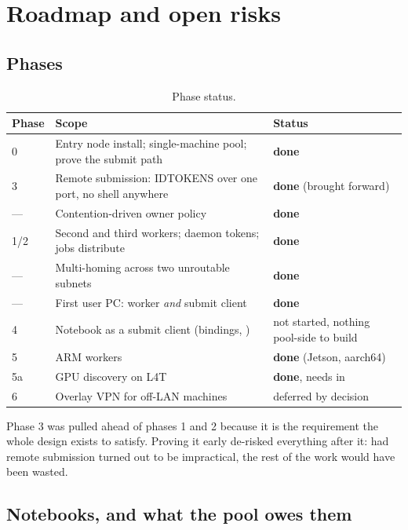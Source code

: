 \section{Roadmap and open risks}
\label{sec:limits}

\subsection{Phases}

\begin{table}[H]
\centering
\begin{tabularx}{\textwidth}{l L{0.46\textwidth} Y}
\toprule
\textbf{Phase} & \textbf{Scope} & \textbf{Status} \\
 & Entry node install; single-machine pool; prove the submit path & \textbf{done} \\
3 & Remote submission: IDTOKENS over one port, no shell anywhere & \textbf{done} (brought forward) \\
--- & Contention-driven owner policy & \textbf{done} \\
1/2 & Second and third workers; daemon tokens; jobs distribute & \textbf{done} \\
--- & Multi-homing across two unroutable subnets & \textbf{done} \\
--- & First user PC: worker \emph{and} submit client & \textbf{done} \\
4 & Notebook as a submit client (bindings, ) & not started, nothing pool-side to build \\
5 & ARM workers & \textbf{done} (Jetson, aarch64) \\
5a & GPU discovery on L4T & \textbf{done}, needs  in  \\
6 & Overlay VPN for off-LAN machines & deferred by decision \\
\bottomrule
\end{tabularx}
\caption{Phase status.}
\end{table}

Phase 3 was pulled ahead of phases 1 and 2 because it is the requirement the
whole design exists to satisfy. Proving it early de-risked everything after it:
had remote submission turned out to be impractical, the rest of the work would
have been wasted.

\subsection{Notebooks, and what the pool owes them}
\label{sec:notebooks}

